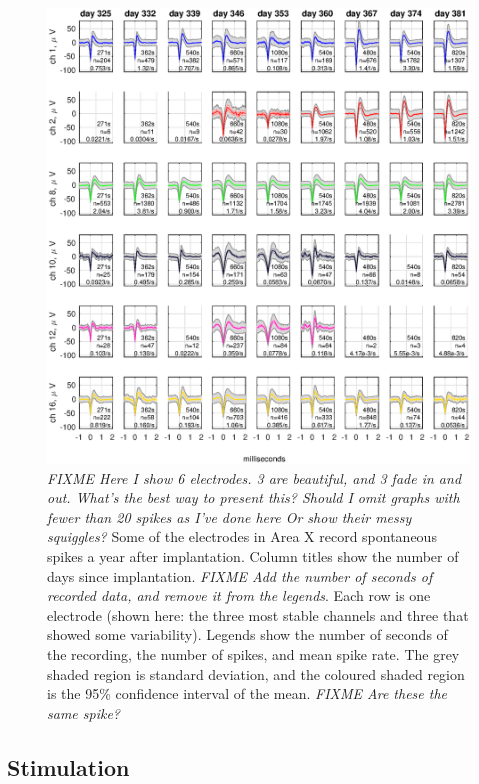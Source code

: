 \documentclass[10pt,letterpaper]{article}
\begin{document}
\begin{figure}
  \includegraphics[width=\textwidth]{XSpikeRecording}
  \caption{{\em FIXME Here I show 6 electrodes.  3 are beautiful, and
      3 fade in and out.  What's the best way to present this?  Should
      I omit graphs with fewer than 20 spikes as I've done here Or
      show their messy squiggles?}  Some of the electrodes in Area X
    record spontaneous spikes a year after implantation.  Column
    titles show the number of days since implantation. {\em FIXME Add the number of seconds of
    recorded data, and remove it from the legends}.  Each row is one electrode (shown here: the three
    most stable channels and three that showed some variability).
    Legends show the number of seconds of the recording, the number of
    spikes, and mean spike rate.  The grey shaded region is standard
    deviation, and the coloured shaded region is the 95\% confidence
    interval of the mean. {\em FIXME Are these the same spike?}}
  \label{fig:XSpikeRecording}
\end{figure}




\subsection{Stimulation}
\end{document}
